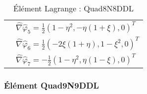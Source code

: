 \begin{table}[H]
\begin{minipage}[t]{0.48\linewidth}
\begin{tabular}{>{\bfseries} l|l}
			& $\widehat{\nabla}\widehat{\varphi}_5 = \frac{1}{2}\left(1-\eta^2, -\eta(1+\xi), 0\right)^T$ \\
			& $\widehat{\nabla}\widehat{\varphi}_6 = \frac{1}{2}\left(-2\xi(1+\eta), 1-\xi^2, 0\right)^T$ \\
			& $\widehat{\nabla}\widehat{\varphi}_7 = -\frac{1}{2}\left(1-\eta^2, \eta(1-\xi), 0\right)^T$ \\
			\bottomrule %
		\end{tabular}
		\caption{Élément Lagrange : Quad8N8DDL}
		\label{tab:Quad8N8DDL}
	\end{minipage}\hfill
\end{table}

\subsubsection{Élément Quad9N9DDL}
